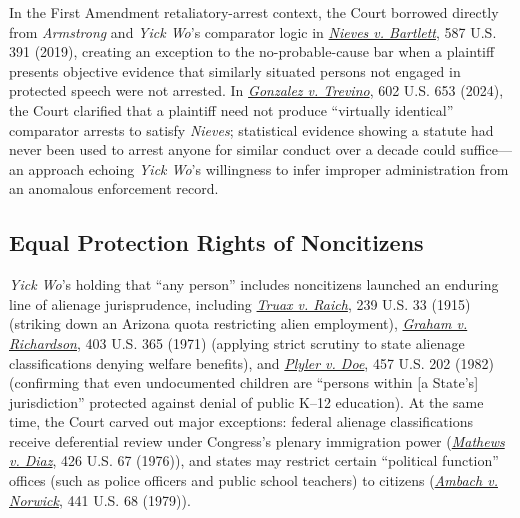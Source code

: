 \documentclass[12pt]{article}
\begin{document}
In the First Amendment retaliatory-arrest context, the Court borrowed directly from \emph{Armstrong} and \emph{Yick Wo}'s comparator logic in \href{https://supreme.justia.com/cases/federal/us/587/17-1174/}{\emph{Nieves v. Bartlett}}, 587 U.S. 391 (2019), creating an exception to the no-probable-cause bar when a plaintiff presents objective evidence that similarly situated persons not engaged in protected speech were not arrested. In \href{https://supreme.justia.com/cases/federal/us/602/22-1025/}{\emph{Gonzalez v. Trevino}}, 602 U.S. 653 (2024), the Court clarified that a plaintiff need not produce ``virtually identical'' comparator arrests to satisfy \emph{Nieves}; statistical evidence showing a statute had never been used to arrest anyone for similar conduct over a decade could suffice---an approach echoing \emph{Yick Wo}'s willingness to infer improper administration from an anomalous enforcement record.

\subsection{Equal Protection Rights of Noncitizens}
\emph{Yick Wo}'s holding that ``any person'' includes noncitizens launched an enduring line of alienage jurisprudence, including \href{https://supreme.justia.com/cases/federal/us/239/33/}{\emph{Truax v. Raich}}, 239 U.S. 33 (1915) (striking down an Arizona quota restricting alien employment), \href{https://supreme.justia.com/cases/federal/us/403/365/}{\emph{Graham v. Richardson}}, 403 U.S. 365 (1971) (applying strict scrutiny to state alienage classifications denying welfare benefits), and \href{https://supreme.justia.com/cases/federal/us/457/202/}{\emph{Plyler v. Doe}}, 457 U.S. 202 (1982) (confirming that even undocumented children are ``persons within [a State's] jurisdiction'' protected against denial of public K--12 education). At the same time, the Court carved out major exceptions: federal alienage classifications receive deferential review under Congress's plenary immigration power (\href{https://supreme.justia.com/cases/federal/us/426/67/}{\emph{Mathews v. Diaz}}, 426 U.S. 67 (1976)), and states may restrict certain ``political function'' offices (such as police officers and public school teachers) to citizens (\href{https://supreme.justia.com/cases/federal/us/441/68/}{\emph{Ambach v. Norwick}}, 441 U.S. 68 (1979)).
\end{document}

